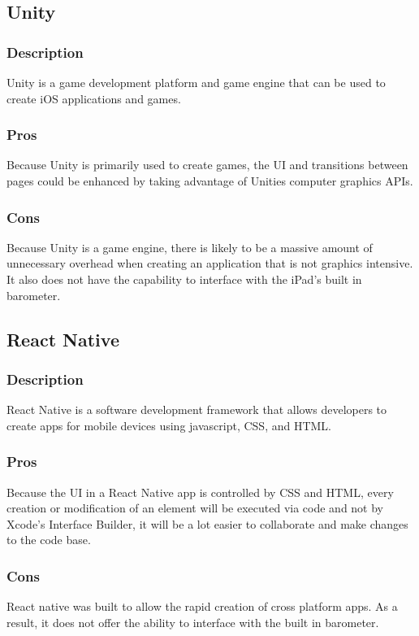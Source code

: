 \documentclass[onecolumn, draftclsnofoot,10pt, compsoc]{IEEEtran}
\begin{document}
\subsection{Unity}
\subsubsection*{Description}
Unity is a game development platform and game engine that can be used to create iOS applications and games.

\subsubsection*{Pros}
Because Unity is primarily used to create games, the UI and transitions between pages could be enhanced by taking advantage of Unities computer graphics APIs.

\subsubsection*{Cons}
Because Unity is a game engine, there is likely to be a massive amount of unnecessary overhead when creating an application that is not graphics intensive. It also does not have the capability to interface with the iPad's built in barometer.

\subsection{React Native}
\subsubsection*{Description}
React Native is a software development framework that allows developers to create apps for mobile devices using javascript, CSS, and HTML.

\subsubsection*{Pros}
Because the UI in a React Native app is controlled by CSS and HTML, every creation or modification of an element will be executed via code and not by Xcode's Interface Builder, it will be a lot easier to collaborate and make changes to the code base.

\subsubsection*{Cons}
React native was built to allow the rapid creation of cross platform apps. As a result, it does not offer the ability to interface with the built in barometer.
\end{document}
